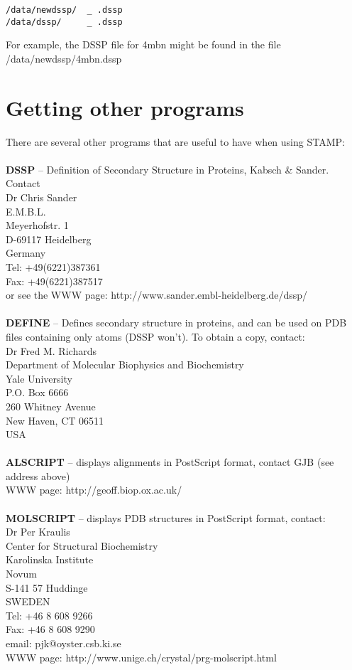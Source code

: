 \begin{scriptsize}\begin{verbatim}
/data/newdssp/  _ .dssp
/data/dssp/     _ .dssp
\end{verbatim} \end{scriptsize}

For example, the DSSP file for 4mbn might be found in the file 
/data/newdssp/4mbn.dssp

\section{Getting other programs}

There are several other programs that are useful to have when using STAMP:\\
\\
{\bf DSSP} -- Definition of Secondary Structure in Proteins, Kabsch \& Sander.  Contact\\
Dr Chris Sander\\
E.M.B.L.\\
Meyerhofstr. 1\\
D-69117 Heidelberg\\
Germany\\
Tel: +49(6221)387361\\
Fax: +49(6221)387517\\
or see the WWW page: http://www.sander.embl-heidelberg.de/dssp/\\
\\
{\bf DEFINE} -- Defines secondary structure in proteins, and can be used on PDB files containing
only \Cal atoms (DSSP won't).  To obtain a copy, contact:\\
Dr Fred M. Richards\\
Department of Molecular Biophysics and Biochemistry\\
Yale University\\
P.O. Box 6666\\
260 Whitney Avenue\\
New Haven, CT 06511\\
USA\\
\\
{\bf ALSCRIPT} -- displays alignments in PostScript format, contact GJB (see address above)\\
WWW page: http://geoff.biop.ox.ac.uk/\\
\\
{\bf MOLSCRIPT} -- displays PDB structures in PostScript format, contact:\\
Dr Per Kraulis \\
Center for Structural Biochemistry \\
Karolinska Institute \\
Novum \\
S-141 57 Huddinge \\
SWEDEN\\
Tel: +46 8 608 9266 \\
Fax: +46 8 608 9290 \\
email: pjk@oyster.csb.ki.se \\
WWW page: http://www.unige.ch/crystal/prg-molscript.html



